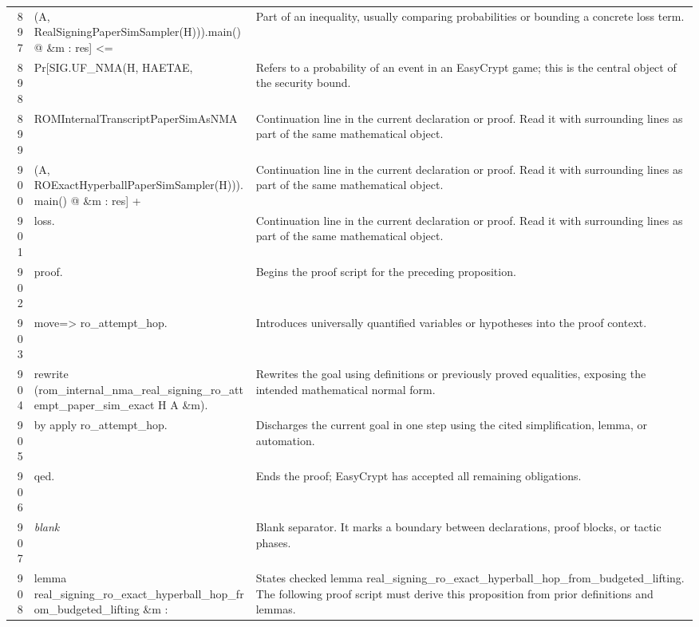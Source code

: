 \documentclass[10pt]{article}
\begin{document}
\begin{longtable}{r L{0.53\textwidth} L{0.37\textwidth}}
897 & {\ttfamily\scriptsize          (A, RealSigningPaperSimSampler(H))).main() @ \&m : res] <=} & Part of an inequality, usually comparing probabilities or bounding a concrete loss term. \\
898 & {\ttfamily\scriptsize   Pr[SIG.UF\_NMA(H, HAETAE,} & Refers to a probability of an event in an EasyCrypt game; this is the central object of the security bound. \\
899 & {\ttfamily\scriptsize        ROMInternalTranscriptPaperSimAsNMA} & Continuation line in the current declaration or proof.  Read it with surrounding lines as part of the same mathematical object. \\
900 & {\ttfamily\scriptsize          (A, ROExactHyperballPaperSimSampler(H))).main() @ \&m : res] +} & Continuation line in the current declaration or proof.  Read it with surrounding lines as part of the same mathematical object. \\
901 & {\ttfamily\scriptsize     loss.} & Continuation line in the current declaration or proof.  Read it with surrounding lines as part of the same mathematical object. \\
902 & {\ttfamily\scriptsize proof.} & Begins the proof script for the preceding proposition. \\
903 & {\ttfamily\scriptsize move=> ro\_attempt\_hop.} & Introduces universally quantified variables or hypotheses into the proof context. \\
904 & {\ttfamily\scriptsize rewrite (rom\_internal\_nma\_real\_signing\_ro\_attempt\_paper\_sim\_exact H A \&m).} & Rewrites the goal using definitions or previously proved equalities, exposing the intended mathematical normal form. \\
905 & {\ttfamily\scriptsize by apply ro\_attempt\_hop.} & Discharges the current goal in one step using the cited simplification, lemma, or automation. \\
906 & {\ttfamily\scriptsize qed.} & Ends the proof; EasyCrypt has accepted all remaining obligations. \\
907 & {\ttfamily\scriptsize \emph{blank}} & Blank separator.  It marks a boundary between declarations, proof blocks, or tactic phases. \\
908 & {\ttfamily\scriptsize lemma real\_signing\_ro\_exact\_hyperball\_hop\_from\_budgeted\_lifting \&m :} & States checked lemma real\_signing\_ro\_exact\_hyperball\_hop\_from\_budgeted\_lifting.  The following proof script must derive this proposition from prior definitions and lemmas. \\

\end{longtable}
\end{document}
